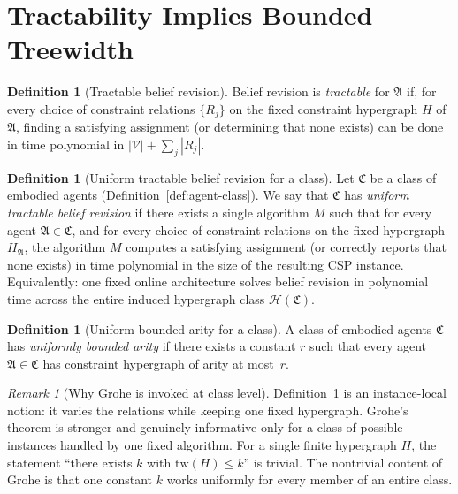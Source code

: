 \documentclass[11pt,a4paper]{article}
\theoremstyle{plain}
\theoremstyle{definition}
\newtheorem{definition}[theorem]{Definition}
\theoremstyle{remark}
\newtheorem{remark}[theorem]{Remark}
\begin{document}
\section{Tractability Implies Bounded Treewidth}\label{sec:tractability}

\begin{definition}[Tractable belief revision]\label{def:tractable-revision}
Belief revision is \emph{tractable} for $\mathfrak{A}$ if, for every choice of constraint relations $\{R_j\}$ on the fixed constraint hypergraph $H$ of $\mathfrak{A}$, finding a satisfying assignment (or determining that none exists) can be done in time polynomial in $|\mathcal{V}| + \sum_j |R_j|$.
\end{definition}

\begin{definition}[Uniform tractable belief revision for a class]\label{def:uniform-tractable-revision}
Let $\mathfrak{C}$ be a class of embodied agents (Definition~\ref{def:agent-class}).
We say that $\mathfrak{C}$ has \emph{uniform tractable belief revision} if there exists a single algorithm $M$ such that for every agent $\mathfrak{A} \in \mathfrak{C}$, and for every choice of constraint relations on the fixed hypergraph $H_{\mathfrak{A}}$, the algorithm $M$ computes a satisfying assignment (or correctly reports that none exists) in time polynomial in the size of the resulting CSP instance.
Equivalently: one fixed online architecture solves belief revision in polynomial time across the entire induced hypergraph class $\mathcal{H}(\mathfrak{C})$.
\end{definition}

\begin{definition}[Uniform bounded arity for a class]\label{def:class-bounded-arity}
A class of embodied agents $\mathfrak{C}$ has \emph{uniformly bounded arity} if there exists a constant $r$ such that every agent $\mathfrak{A} \in \mathfrak{C}$ has constraint hypergraph of arity at most~$r$.
\end{definition}

\begin{remark}[Why Grohe is invoked at class level]\label{rem:grohe-class}
Definition~\ref{def:tractable-revision} is an instance-local notion: it varies the relations while keeping one fixed hypergraph.
Grohe's theorem is stronger and genuinely informative only for a class of possible instances handled by one fixed algorithm.
For a single finite hypergraph $H$, the statement ``there exists $k$ with $\mathrm{tw}(H) \leq k$'' is trivial.
The nontrivial content of Grohe is that one constant $k$ works uniformly for every member of an entire class.
\end{remark}
\end{document}
